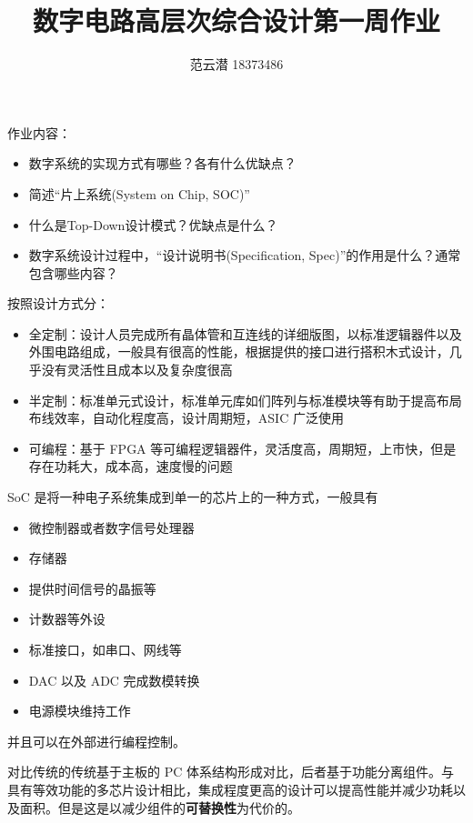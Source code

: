 \documentclass[lang=cn,11pt,a4paper,cite=authoryear]{elegantpaper}
\title{数字电路高层次综合设计\quad 第一周作业}
\author{范云潜 18373486}
\institute{微电子学院 184111 班}
\date{\zhtoday}
\begin{document}
\maketitle

作业内容：

\begin{itemize}
    \item 数字系统的实现方式有哪些？各有什么优缺点？
    \item 简述“片上系统(System on Chip, SOC)”
    \item 什么是Top-Down设计模式？优缺点是什么？
    \item 数字系统设计过程中，“设计说明书(Specification, Spec)”的作用是什么？通常包含哪些内容？
\end{itemize}



按照设计方式分：

\begin{itemize}
    \item 全定制：设计人员完成所有晶体管和互连线的详细版图，以标准逻辑器件以及外围电路组成，一般具有很高的性能，根据提供的接口进行搭积木式设计，几乎没有灵活性且成本以及复杂度很高
    \item 半定制：标准单元式设计，标准单元库如们阵列与标准模块等有助于提高布局布线效率，自动化程度高，设计周期短，ASIC 广泛使用
    \item 可编程：基于 FPGA 等可编程逻辑器件，灵活度高，周期短，上市快，但是存在功耗大，成本高，速度慢的问题
\end{itemize}


SoC 是将一种电子系统集成到单一的芯片上的一种方式，一般具有 

\begin{itemize}
    \item 微控制器或者数字信号处理器
    \item 存储器
    \item 提供时间信号的晶振等
    \item 计数器等外设
    \item 标准接口，如串口、网线等
    \item DAC 以及 ADC 完成数模转换
    \item 电源模块维持工作
\end{itemize}
并且可以在外部进行编程控制。

对比传统的传统基于主板的 PC 体系结构形成对比，后者基于功能分离组件。与具有等效功能的多芯片设计相比，集成程度更高的设计可以提高性能并减少功耗以及面积。但是这是以减少组件的\textbf{可替换性}为代价的。
\end{document}
